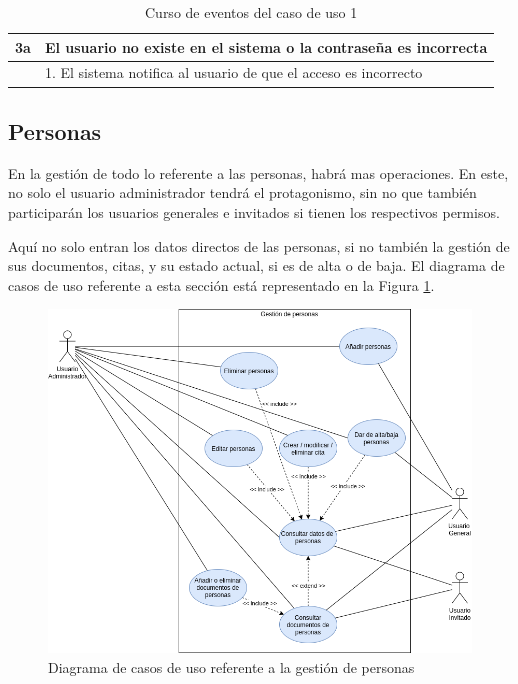 \begin{table}[hp!]
{\begin{tabular}{|l|l|l|l|}
        \hline
        3a & \multicolumn{3}{l|}{ El usuario no existe en el sistema o la contraseña es incorrecta }                                                                                                                                          \\ 
        \hline
        & \multicolumn{3}{l|}{1. El sistema notifica al usuario de que el acceso es incorrecto}                                                                                                                                            \\
        \hline
        \end{tabular}
    }
    \caption{Curso de eventos del caso de uso 1}
\end{table}

\newpage

\subsection{Personas}

En la gestión de todo lo referente a las personas, habrá mas operaciones. En este, no solo el usuario administrador tendrá el protagonismo, sin no que también participarán los usuarios generales e invitados si tienen los respectivos permisos.

Aquí no solo entran los datos directos de las personas, si no también la gestión de sus documentos, citas, y su estado actual, si es de alta o de baja. El diagrama de casos de uso referente a esta sección está representado en la Figura \ref{fig:cu_personas}. 

\begin{figure}[h!]
    \centering
    \includegraphics[width=1\linewidth]{diseno/sistema/CU/personas.png}
    \caption{Diagrama de casos de uso referente a la gestión de personas}
    \label{fig:cu_personas}
\end{figure}

